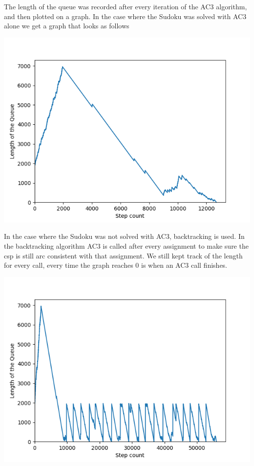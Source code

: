 \documentclass{article}
\begin{document}
The length of the queue was recorded after every iteration of the AC3 algorithm, and then plotted on a graph.
\newline
In the case where the Sudoku was solved with AC3 alone we get a graph that looks as follows

\includegraphics[scale=0.6]{Sudoku-Queue-length-plot-29.png}

In the case where the Sudoku was not solved with AC3, backtracking is used. In the backtracking algorithm AC3 is called after every assignment to make sure the csp is still arc consistent with that assignment. We still kept track of the length for every call, every time the graph reaches 0 is when an AC3 call finishes.

\includegraphics[scale=0.6]{Sudoku-Queue-length-plot-10.png}
\end{document}
